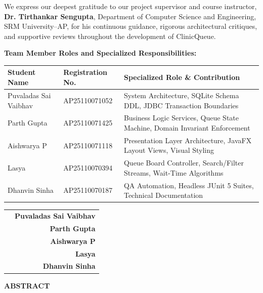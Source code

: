 \documentclass[12pt,a4paper,oneside]{report}
\begin{document}
\noindent
We express our deepest gratitude to our project supervisor and course instructor, \textbf{Dr. Tirthankar Sengupta}, Department of Computer Science and Engineering, SRM University--AP, for his continuous guidance, rigorous architectural critiques, and supportive reviews throughout the development of ClinicQueue.

\vspace{0.3cm}
\noindent
\textbf{Team Member Roles and Specialized Responsibilities:}
\vspace{0.15cm}

\begin{table}[H]
\centering
\small
\begin{tabularx}{\textwidth}{p{4.2cm} p{2.8cm} X}
\toprule
\textbf{Student Name} & \textbf{Registration No.} & \textbf{Specialized Role \& Contribution} \\
\midrule
Puvaladas Sai Vaibhav & AP25110071052 & System Architecture, SQLite Schema DDL, JDBC Transaction Boundaries \\
Parth Gupta & AP25110071425 & Business Logic Services, Queue State Machine, Domain Invariant Enforcement \\
Aishwarya P & AP25110071118 & Presentation Layer Architecture, JavaFX Layout Views, Visual Styling \\
Lasya & AP25110070394 & Queue Board Controller, Search/Filter Streams, Wait-Time Algorithms \\
Dhanvin Sinha & AP25110070187 & QA Automation, Headless JUnit 5 Suites, Technical Documentation \\
\bottomrule
\end{tabularx}
\end{table}

\vspace{0.6cm}
\noindent
\begin{tabularx}{\textwidth}{X r}
 & \textbf{Puvaladas Sai Vaibhav} \\
 & \textbf{Parth Gupta} \\
 & \textbf{Aishwarya P} \\
 & \textbf{Lasya} \\
 & \textbf{Dhanvin Sinha} \\
\end{tabularx}

\newpage
\begin{center}
    \vspace*{0.2cm}
    {\Huge \textbf{ABSTRACT}}\\[0.6cm]
\end{center}
\end{document}
